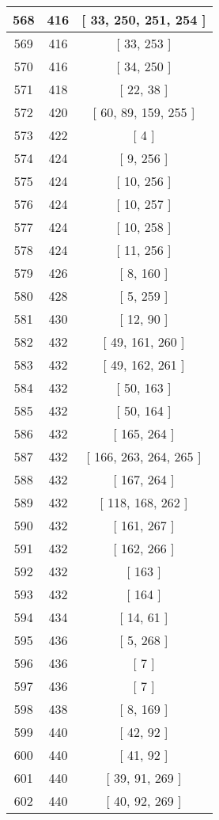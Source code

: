 \begin{center}
\begin{longtable}[H]{|| c c c ||}
\hline
568 & 416 & [ 33, 250, 251, 254 ] \\ 
\hline
569 & 416 & [ 33, 253 ] \\ 
\hline
570 & 416 & [ 34, 250 ] \\ 
\hline
571 & 418 & [ 22, 38 ] \\ 
\hline
572 & 420 & [ 60, 89, 159, 255 ] \\ 
\hline
573 & 422 & [ 4 ] \\ 
\hline
574 & 424 & [ 9, 256 ] \\ 
\hline
575 & 424 & [ 10, 256 ] \\ 
\hline
576 & 424 & [ 10, 257 ] \\ 
\hline
577 & 424 & [ 10, 258 ] \\ 
\hline
578 & 424 & [ 11, 256 ] \\ 
\hline
579 & 426 & [ 8, 160 ] \\ 
\hline
580 & 428 & [ 5, 259 ] \\ 
\hline
581 & 430 & [ 12, 90 ] \\ 
\hline
582 & 432 & [ 49, 161, 260 ] \\ 
\hline
583 & 432 & [ 49, 162, 261 ] \\ 
\hline
584 & 432 & [ 50, 163 ] \\ 
\hline
585 & 432 & [ 50, 164 ] \\ 
\hline
586 & 432 & [ 165, 264 ] \\ 
\hline
587 & 432 & [ 166, 263, 264, 265 ] \\ 
\hline
588 & 432 & [ 167, 264 ] \\ 
\hline
589 & 432 & [ 118, 168, 262 ] \\ 
\hline
590 & 432 & [ 161, 267 ] \\ 
\hline
591 & 432 & [ 162, 266 ] \\ 
\hline
592 & 432 & [ 163 ] \\ 
\hline
593 & 432 & [ 164 ] \\ 
\hline
594 & 434 & [ 14, 61 ] \\ 
\hline
595 & 436 & [ 5, 268 ] \\ 
\hline
596 & 436 & [ 7 ] \\ 
\hline
597 & 436 & [ 7 ] \\ 
\hline
598 & 438 & [ 8, 169 ] \\ 
\hline
599 & 440 & [ 42, 92 ] \\ 
\hline
600 & 440 & [ 41, 92 ] \\ 
\hline
601 & 440 & [ 39, 91, 269 ] \\ 
\hline
602 & 440 & [ 40, 92, 269 ] \\ 

\end{longtable}
\end{center}
